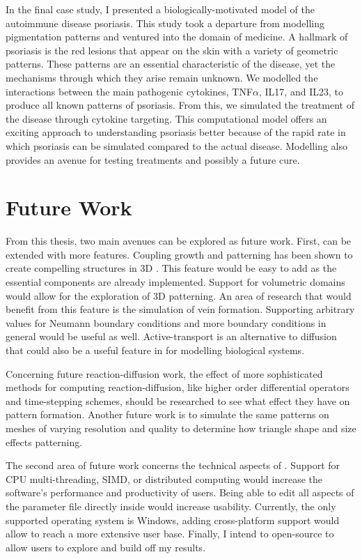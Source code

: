 In the final case study, I presented a biologically-motivated model of the autoimmune disease psoriasis. This study took a departure from modelling pigmentation patterns and ventured into the domain of medicine. A hallmark of psoriasis is the red lesions that appear on the skin with a variety of geometric patterns. These patterns are an essential characteristic of the disease, yet the mechanisms through which they arise remain unknown. We modelled the interactions between the main pathogenic cytokines, TNF$\alpha$, IL17, and IL23, to produce all known patterns of psoriasis. From this, we simulated the treatment of the disease through cytokine targeting. This computational model offers an exciting approach to understanding psoriasis better because of the rapid rate in which psoriasis can be simulated compared to the actual disease. Modelling also provides an avenue for testing treatments and possibly a future cure.

\section{Future Work}
From this thesis, two main avenues can be explored as future work. First, \ProgramName{} can be extended with more features. Coupling growth and patterning has been shown to create compelling structures in 3D \cite{harrison2002, holloway2007}. This feature would be easy to add as the essential components are already implemented. Support for volumetric domains would allow for the exploration of 3D patterning. An area of research that would benefit from this feature is the simulation of vein formation. Supporting arbitrary values for Neumann boundary conditions and more boundary conditions in general would be useful as well. Active-transport is an alternative to diffusion that could also be a useful feature in \ProgramName{} for modelling biological systems. 

Concerning future reaction-diffusion work, the effect of more sophisticated methods for computing reaction-diffusion, like higher order differential operators and time-stepping schemes, should be researched to see what effect they have on pattern formation. Another future work is to simulate the same patterns on meshes of varying resolution and quality to determine how triangle shape and size effects patterning.

The second area of future work concerns the technical aspects of \ProgramName{}. Support for CPU multi-threading, SIMD, or distributed computing would increase the software's performance and productivity of users. Being able to edit all aspects of the parameter file directly inside \ProgramName{} would increase usability. Currently, the only supported operating system is Windows, adding cross-platform support would allow \ProgramName{} to reach a more extensive user base. Finally, I intend to open-source \ProgramName{} to allow users to explore and build off my results.